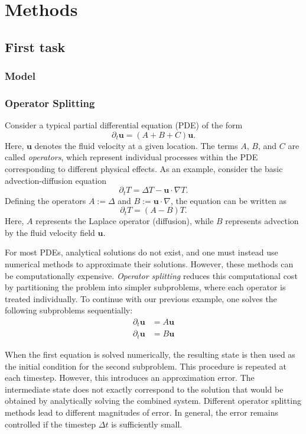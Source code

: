 \chapter{Methods}

\section{First task}
\subsection{Model}

\subsection{Operator Splitting}

Consider a typical partial differential equation (PDE) of the form
$$ \partial_t \bm{u} = (A + B + C)\bm{u}. $$
Here, $\bm{u}$ denotes the fluid velocity at a given location. The terms
$A$, $B$, and $C$ are called \textit{operators}, which represent 
individual processes within the PDE corresponding to different physical 
effects. As an example, consider the basic advection-diffusion equation
$$\partial_t T = \Delta T - \bm{u} \cdot \nabla T.$$
Defining the operators $A := \Delta$ and $B := \bm{u} \cdot \nabla$, the 
equation can be written as
$$\partial_t T  = (A - B) T.$$
Here, $A$ represents the Laplace operator (diffusion), while $B$ 
represents advection by the fluid velocity field $\bm{u}$.

For most PDEs, analytical solutions do not exist, and one must instead 
use numerical methods to approximate their solutions. However, these 
methods can be computationally expensive. \textit{Operator splitting} 
reduces this computational cost by partitioning the problem into simpler
subproblems, where each operator is treated individually. To continue 
with our previous example, one solves the following subproblems 
sequentially: 
\begin{align}
\partial_t \bm{u} &= A \bm{u} \\
\partial_t \bm{u} &= B \bm{u}
\end{align}


When the first equation is solved numerically, the resulting state is then
used as the initial condition for the second subproblem. This procedure is
repeated at each timestep. However, this introduces an approximation 
error. The intermediate state does not exactly correspond to the solution
that would be obtained by analytically solving the combined system.
Different operator splitting methods lead to different magnitudes of
error. In general, the error remains controlled if the timestep $\Delta t$
is sufficiently small.

